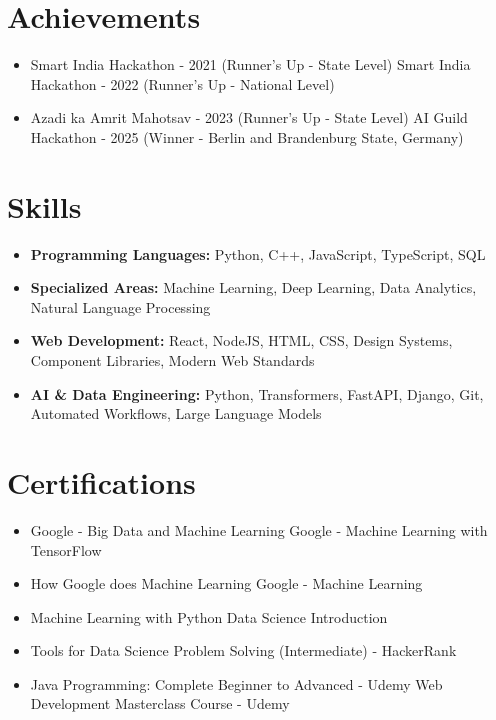 \documentclass[a4paper,10pt]{article}
\begin{document}
\section*{Achievements}
\begin{itemize}
\item Smart India Hackathon - 2021 (Runner's Up - State Level) \hfill Smart India Hackathon - 2022 (Runner's Up - National Level)
\item Azadi ka Amrit Mahotsav - 2023 (Runner's Up - State Level) \hfill AI Guild Hackathon - 2025 (Winner - Berlin and Brandenburg State, Germany)
\end{itemize}

\section*{Skills}
\begin{itemize}
  \item \textbf{Programming Languages:} Python, C++, JavaScript, TypeScript, SQL
  \item \textbf{Specialized Areas:} Machine Learning, Deep Learning, Data Analytics, Natural Language Processing
  \item \textbf{Web Development:} React, NodeJS, HTML, CSS, Design Systems, Component Libraries, Modern Web Standards
  \item \textbf{AI \& Data Engineering:} Python, Transformers, FastAPI, Django, Git, Automated Workflows, Large Language Models
\end{itemize}

\section*{Certifications}
\begin{itemize}
\item Google - Big Data and Machine Learning \hfill Google - Machine Learning with TensorFlow
\item How Google does Machine Learning \hfill Google - Machine Learning
\item Machine Learning with Python \hfill Data Science Introduction
\item Tools for Data Science \hfill Problem Solving (Intermediate) - HackerRank
\item Java Programming: Complete Beginner to Advanced - Udemy \hfill Web Development Masterclass Course - Udemy
\end{itemize}
\end{document}
